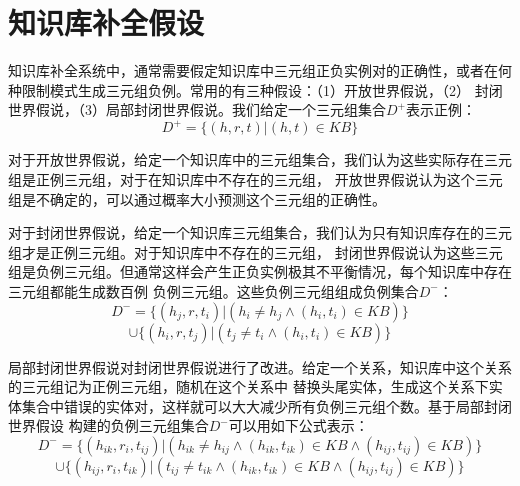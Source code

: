 \section{知识库补全假设}
知识库补全系统中，通常需要假定知识库中三元组正负实例对的正确性，或者在何种限制模式生成三元组负例。常用的有三种假设：（1）开放世界假说，（2）
封闭世界假说，（3）局部封闭世界假说。我们给定一个三元组集合$D^+$表示正例：
$$D^+=\{(h,r,t)|(h,t) \in KB\}$$

对于开放世界假说，给定一个知识库中的三元组集合，我们认为这些实际存在三元组是正例三元组，对于在知识库中不存在的三元组，
开放世界假说认为这个三元组是不确定的，可以通过概率大小预测这个三元组的正确性。

对于封闭世界假说，给定一个知识库三元组集合，我们认为只有知识库存在的三元组才是正例三元组。对于知识库中不存在的三元组，
封闭世界假说认为这些三元组是负例三元组。但通常这样会产生正负实例极其不平衡情况，每个知识库中存在三元组都能生成数百例
负例三元组。这些负例三元组组成负例集合$D^-$：
$$D^-=\{(h_j,r,t_i)|(h_i \ne h_j \wedge (h_i,t_i) \in KB)\}$$
$$ \cup \{(h_i,r,t_j)|(t_j \ne t_i \wedge(h_i,t_i) \in KB)\}$$

局部封闭世界假说对封闭世界假说进行了改进。给定一个关系，知识库中这个关系的三元组记为正例三元组，随机在这个关系中
替换头尾实体，生成这个关系下实体集合中错误的实体对，这样就可以大大减少所有负例三元组个数。基于局部封闭世界假设
构建的负例三元组集合$D^-$可以用如下公式表示：
$$D^-=\{(h_{ik},r_i,t_{ij})|(h_{ik} \ne h_{ij} \wedge (h_{ik},t_{ik}) \in KB  \wedge (h_{ij},t_{ij}) \in KB)\}$$
$$ \cup \{(h_{ij},r_i,t_{ik})|(t_{ij} \ne t_{ik} \wedge(h_{ik},t_{ik}) \in KB \wedge(h_{ij},t_{ij}) \in KB)\}$$ 